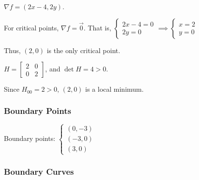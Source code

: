 \documentclass[11pt,fleqn]{book} %
\begin{document}
$\nabla f = (2x - 4, 2y)$. 

For critical points, $\nabla f = \vec{0}$. That is, $\begin{cases} 2x - 4 = 0 \\ 2y = 0 \end{cases} \implies \begin{cases} x = 2 \\ y = 0 \end{cases}$

Thus, $(2, 0)$ is the only critical point. 

$H = \begin{bmatrix} 2 & 0 \\ 0 & 2 \end{bmatrix}$, and $\det H = 4 > 0$. 

Since $H_{00} = 2 > 0$, $(2, 0)$ is a local minimum. 

\subsubsection*{Boundary Points}

Boundary points: $\begin{cases} (0, -3) \\ (-3, 0) \\ (3, 0) \end{cases}$

\subsubsection*{Boundary Curves}
\end{document}
